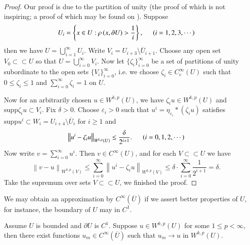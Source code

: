 \begin{proof}
Our proof is due to the partition of unity (the proof of which is not inspiring; a proof of which may be found on \cite{rudin_2015_real}). Suppose 
$$
U_i=\left\{ x\in U:\rho \left( x,\partial U \right) >\frac{1}{i} \right\} ,\hspace{0.5cm}\left( i=1,2,3,\cdots \right) 
$$
then we have $U=\bigcup_{i=1}^\infty U_i$. Write $V_i=U_{i+3}\setminus\overline{U}_{i+1}$. Choose any open set $V_0\subset\subset U$ so that $U=\bigcup_{i=0}^\infty V_i$. Now let $\{\zeta_i\}_{i=0}^\infty$ be a set of partitions of unity subordinate to the open sets $\{V_i\}_{i=0}^\infty$, i.e. we choose $\zeta_i\in C_c^\infty(U)$ such that $0\le\zeta_i\le 1$ and $\sum_{i=0}^\infty\zeta_i=1$ on $U$.\par
Now for an arbitrarily chosen $u\in W^{k,p}(U)$, we have $\zeta_iu\in W^{k,p}(U)$ and $\mathrm{supp}\zeta_iu\subset V_i$. Fix $\delta>0$. Choose $\varepsilon_i>0$ such that $u^i=\eta_{\varepsilon_i}*(\zeta_iu)$ satisfies $\mathrm{supp}u^i\subset W_i=U_{i+4}\setminus\overline{U}_i$ for $i\ge 1$ and 
$$
\left\| u^i-\zeta _iu \right\| _{W^{k,p}\left( U \right)}\le \frac{\delta}{2^{i+1}}.\hspace{0.5cm}\left( i=0,1,2,\cdots \right) 
$$
Now write $v=\sum_{i=0}^\infty u^i$. Then $v\in C^\infty(U)$, and for each $V\subset\subset U$ we have 
$$
\left\| v-u \right\| _{W^{k,p}\left( V \right)}\le \sum_{i=0}^{\infty}{\left\| u^i-\zeta _iu \right\| _{W^{k,p}\left( V \right)}}\le \delta \cdot \sum_{i=0}^{\infty}{\frac{1}{2^{i+1}}}=\delta .
$$
Take the supremum over sets $V\subset\subset U$, we finished the proof.
\end{proof}
We may obtain an approximation by $C^\infty(\overline{U})$ if we assert better properties of $U$, for instance, the boundary of $U$ may in $C^1$.
\begin{theorem}
Assume $U$ is bounded and $\partial U$ is $C^1$. Suppose $u\in W^{k,p}(U)$ for some $1\le p<\infty$, then there exist functions $u_m\in C^\infty(\overline{U})$ such that $u_m\to u$ in $W^{k,p}(U)$.
\end{theorem}
